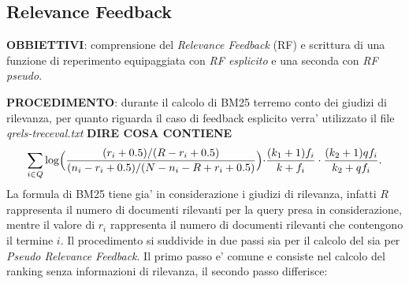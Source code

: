 \subsection{Relevance Feedback}
\label{sec:relevance-feedback}

\textbf{OBBIETTIVI}: comprensione del \textit{Relevance Feedback} (RF) e scrittura di una funzione di reperimento equipaggiata con \textit{RF esplicito} e una seconda con \textit{RF pseudo}.

\textbf{PROCEDIMENTO}: durante il calcolo di BM25 terremo conto dei giudizi di rilevanza, per quanto riguarda il caso di feedback esplicito verra' utilizzato il file \textit{qrels-treceval.txt}  \textbf{DIRE COSA CONTIENE}
\[ \sum\limits_{i \in Q}\log\Bigl(\frac{(r_i+0.5)/(R-r_i+0.5)}{(n_i-r_i+0.5)/(N-n_i-R+r_i+0.5)}\Bigl)\cdot\frac{(k_1+1)f_i}{k+f_i}\cdot\frac{(k_2+1)qf_i}{k_2+qf_i}. \]
La formula di BM25 tiene gia' in considerazione i giudizi di rilevanza, infatti $R$ rappresenta il numero di documenti rilevanti per la query presa in considerazione, mentre il valore di $r_i$ rappresenta il numero di documenti rilevanti che contengono il termine $i$.
Il procedimento si suddivide in due passi sia per il calcolo del  sia per \textit{Pseudo Relevance Feedback}.
Il primo passo e' comune e consiste nel calcolo del ranking senza informazioni di rilevanza, il secondo passo differisce:
